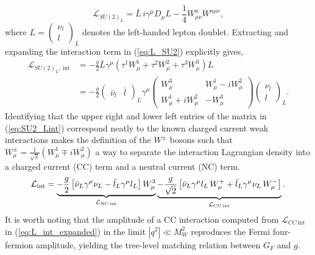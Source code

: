\begin{equation}\label{eq:L_SU2}
  \mathcal{L}_{SU(2)_L} = \bar{L}\, i\gamma^\mu D_\mu L 
  - \frac{1}{4}W^a_{\mu\nu}W^{a\mu\nu},
\end{equation}
where $L = \left(\begin{smallmatrix}\nu_l \\ l\end{smallmatrix}\right)_L$ 
denotes the left-handed lepton doublet. Extracting and expanding the interaction term in (\ref{eq:L_SU2}) explicitly gives,
\begin{equation}\label{eq:SU2_Lint}
  \begin{split}
  \mathcal{L}_{SU(2)_L,~\text{int}} &= -\frac{g}{2}\bar{L}\gamma^\mu (\tau^1 W^1_{\mu} + \tau^2 W^2_{\mu} + \tau^3 W^3_{\mu})L\\
  &= -\frac{g}{2}
  \begin{pmatrix}\bar{\nu}_l & \bar{l}\end{pmatrix}_L
  \gamma^\mu
  \begin{pmatrix} W^3_\mu & W^1_\mu - iW^2_\mu \\ 
  W^1_\mu + iW^2_\mu & -W^3_\mu\end{pmatrix}
  \begin{pmatrix}\nu_l \\ l\end{pmatrix}_L.
  \end{split}
\end{equation}
Identifying that the upper right and lower left entries of the matrix in (\ref{eq:SU2_Lint}) correspond neatly to the known charged current weak interactions makes the definition of the $W^{\pm}$ bosons such that $W^{\pm}_\mu = \frac{1}{\sqrt{2}}(W^1_\mu \mp i W^2_\mu)$ a way to separate the interaction Lagrangian density into a charged current (CC) term and a neutral current (NC) term.
\begin{equation}\label{eq:L_int_expanded}
  \mathcal{L}_{\text{int}} = 
  \underbrace{-\frac{g}{2}\left[\bar{\nu}_L\gamma^\mu\nu_L 
  - \bar{l}_L\gamma^\mu l_L\right]W^3_\mu}_{\mathcal{L}_\text{NC\,int}} 
   \underbrace{-\frac{g}{\sqrt{2}}\left[\bar{\nu}_L\gamma^\mu l_L\, W^+_\mu 
  + \bar{l}_L\gamma^\mu\nu_L\, W^-_\mu\right]}_{\mathcal{L}_\text{CC\,int}}.
\end{equation}
It is worth noting that the amplitude of a CC interaction computed from $\mathcal{L}_{CC\,\text{int}}$ in (\ref{eq:L_int_expanded}) in the limit $|q^2| \ll M_W^2$ reproduces the Fermi four-fermion amplitude, yielding the tree-level matching relation between $G_F$ and $g$.
